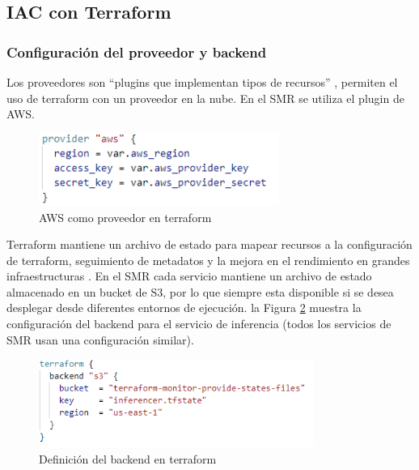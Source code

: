 \subsection{IAC con Terraform}

\subsubsection{Configuración del proveedor y backend}

Los proveedores son ``plugins que implementan tipos de recursos'' \cite{terraform}, permiten el uso de terraform con un proveedor en la nube. En el SMR se utiliza el plugin de AWS.

\begin{figure}[H]
	\centering
	\includegraphics[width=0.7\textwidth]{bibliografia/Imagenes/providertf.PNG}
	\caption{AWS como proveedor en terraform}
	\label{providertf}
\end{figure}

Terraform mantiene un archivo de estado para mapear recursos a la configuración de terraform, seguimiento de metadatos y la mejora en el rendimiento en grandes infraestructuras \cite{terraform}. En el SMR cada servicio mantiene un archivo de estado almacenado en un bucket de S3, por lo que siempre esta disponible si se desea desplegar desde diferentes entornos de ejecución. la Figura \ref{backendtf}  muestra la configuración del backend para el servicio de inferencia (todos los servicios de SMR usan una configuración similar).

\begin{figure}[H]
	\centering
	\includegraphics[width=0.8\textwidth]{bibliografia/Imagenes/backendtf.PNG}
	\caption{Definición del backend en terraform}
	\label{backendtf}
\end{figure}



